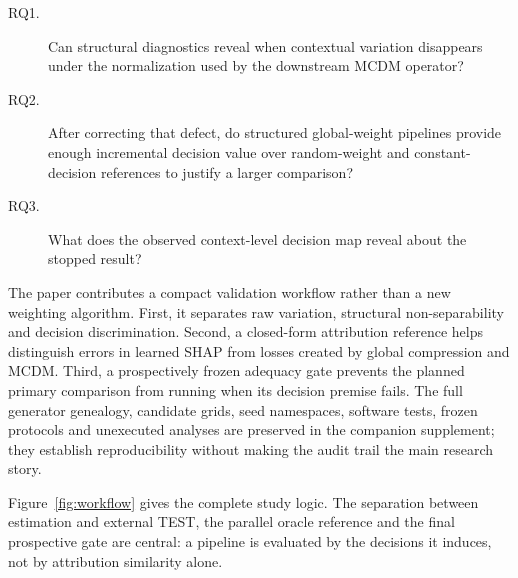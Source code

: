 \documentclass[runningheads]{llncs}
\begin{document}
\begin{description}
\item[RQ1.] Can structural diagnostics reveal when contextual variation disappears under the
normalization used by the downstream MCDM operator?
\item[RQ2.] After correcting that defect, do structured global-weight pipelines provide enough
incremental decision value over random-weight and constant-decision references to justify a
larger comparison?
\item[RQ3.] What does the observed context-level decision map reveal about the stopped result?
\end{description}

The paper contributes a compact validation workflow rather than a new weighting algorithm.
First, it separates raw variation, structural non-separability and decision discrimination.
Second, a closed-form attribution reference helps distinguish errors in learned SHAP from losses
created by global compression and MCDM. Third, a prospectively frozen adequacy gate prevents the
planned primary comparison from running when its decision premise fails. The full generator
genealogy, candidate grids, seed namespaces, software tests, frozen protocols and unexecuted
analyses are preserved in the companion supplement; they establish reproducibility without
making the audit trail the main research story.

Figure~\ref{fig:workflow} gives the complete study logic. The separation between estimation and
external TEST, the parallel oracle reference and the final prospective gate are central: a
pipeline is evaluated by the decisions it induces, not by attribution similarity alone.
\end{document}
